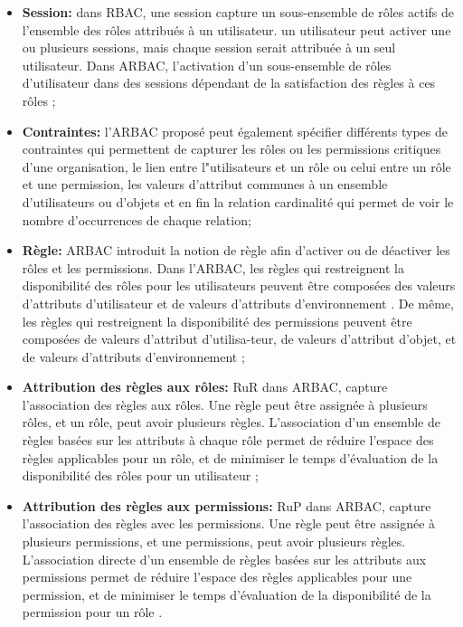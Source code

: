 \begin{itemize}
\item \textbf{Session:} dans RBAC, une session capture un sous-ensemble de rôles actifs de l'ensemble des rôles attribués à un utilisateur. un utilisateur peut activer une ou plusieurs sessions, mais chaque session serait attribuée à un seul utilisateur. Dans ARBAC, l'activation d'un sous-ensemble de rôles d'utilisateur dans des sessions dépendant de la satisfaction des règles à ces rôles \cite{singh19};
\item \textbf{Contraintes:} l'ARBAC proposé peut également spécifier différents types de contraintes qui permettent de capturer les rôles ou les permissions critiques d'une organisation, le lien entre l"utilisateurs et un rôle ou celui entre un rôle et une permission, les valeurs d'attribut communes à un ensemble d'utilisateurs ou d'objets et en fin la relation cardinalité qui permet de voir le nombre d'occurrences de chaque relation;
\item \textbf{Règle:} ARBAC introduit la notion de règle afin d'activer ou de déactiver les rôles et les permissions. Dans l'ARBAC, les règles qui restreignent la disponibilité des rôles pour les utilisateurs peuvent être composées des valeurs d'attributs d'utilisateur et de valeurs d'attributs d'environnement .
De même, les règles qui restreignent la disponibilité des permissions peuvent être composées de valeurs d'attribut d'utilisa-teur, de valeurs d'attribut d'objet, et de valeurs d'attributs d'environnement \cite{singh19};
\item \textbf{Attribution des règles aux rôles:} RuR dans ARBAC, capture l'association des règles aux rôles. Une règle peut être assignée à plusieurs rôles, et un rôle, peut avoir plusieurs règles. L'association d'un ensemble de règles basées sur les attributs à chaque rôle permet de réduire l'espace des règles applicables pour un rôle, et de minimiser le temps d'évaluation de la disponibilité des rôles pour un utilisateur \cite{singh19};
\item \textbf{Attribution des règles aux permissions:} RuP dans ARBAC, capture l'association des règles avec les permissions. Une règle peut être assignée à plusieurs permissions, et une permissions, peut avoir plusieurs règles. L'association directe d'un ensemble de règles basées sur les attributs aux permissions permet de réduire l'espace des règles applicables pour une permission, et de minimiser le temps d'évaluation de la disponibilité de la permission pour un rôle \cite{singh19}.
\end{itemize}

